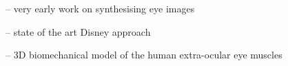 \cite{feng1998variance} -- very early work on synthesising eye images

\cite{berard2014highquality} -- state of the art Disney approach


\cite{priamikov14_openeyesim} -- 3D biomechanical model of the human extra-ocular eye muscles


 


